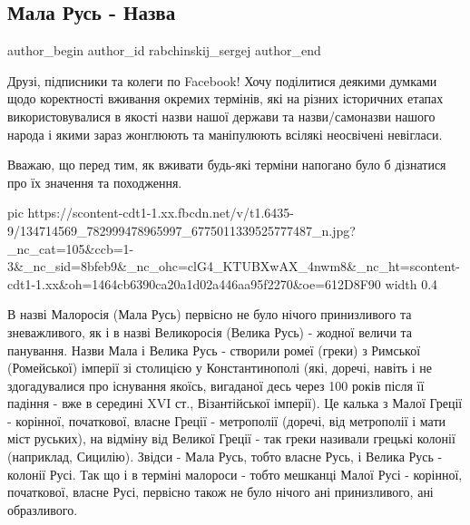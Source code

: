 
 
 
 
 
 
\subsection{Мала Русь - Назва}
\label{sec:02_01_2021.fb.rabchinskij_sergej.1.malorossia_nazva}
 
\ifcmt
 author_begin
   author_id rabchinskij_sergej
 author_end
\fi

Друзі, підписники та колеги по Facebook! Хочу поділитися деякими думками щодо
коректності вживання окремих термінів, які на різних історичних етапах
використовувалися в якості назви нашої держави та назви/самоназви нашого народа
і якими зараз жонглюють та маніпулюють всілякі неосвічені невігласи.

Вважаю, що перед тим, як вживати будь-які терміни напогано було б дізнатися про
їх значення та походження. 

\ifcmt
  pic https://scontent-cdt1-1.xx.fbcdn.net/v/t1.6435-9/134714569_782999478965997_6775011339525777487_n.jpg?_nc_cat=105&ccb=1-3&_nc_sid=8bfeb9&_nc_ohc=clG4_KTUBXwAX_4nwm8&_nc_ht=scontent-cdt1-1.xx&oh=1464cb6390ca20a1d02a446aa95f2270&oe=612D8F90
  width 0.4
\fi

В назві Малоросія (Мала Русь) первісно не було нічого принизливого та
зневажливого, як і в назві Великоросія (Велика Русь) - жодної величи та
панування. Назви Мала і Велика Русь - створили ромеї (греки) з Римської
(Ромейської) імперії зі столицією у Константинополі (які, доречі, навіть і не
здогадувалися про існування якоїсь, вигаданої десь через 100 років після її
падіння - вже в середині XVI ст., Візантійської імперії). Це калька з Малої
Греції - корінної, початкової, власне Греції - метрополії (доречі, від
метрополії і мати міст руських), на відміну від Великої Греції - так греки
називали грецькі колонії (наприклад, Сицилію). Звідси - Мала Русь, тобто
власне Русь, і Велика Русь - колонії Русі. Так що і в терміні малороси - тобто
мешканці Малої Русі - корінної, початкової, власне Русі, первісно також не було
нічого ані принизливого, ані образливого.

